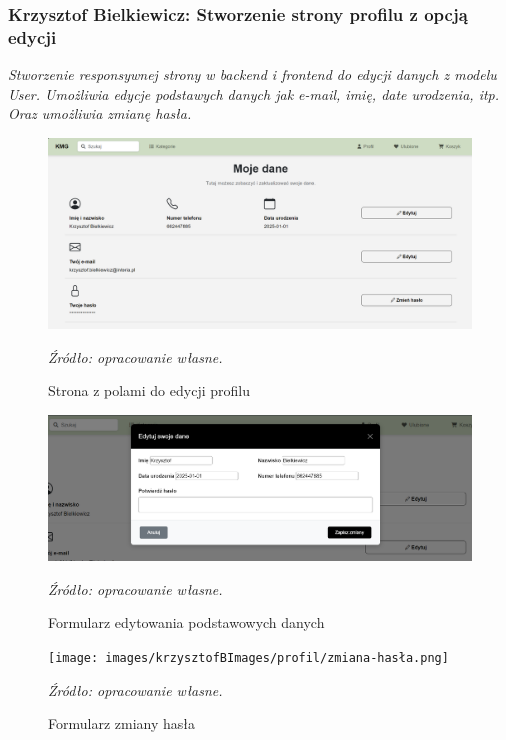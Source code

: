 \documentclass[12pt,a4paper,oneside]{article}
\theoremstyle{definition}
\numberwithin{equation}{section}
\begin{document}
\subsubsection{Krzysztof Bielkiewicz: Stworzenie strony profilu z opcją edycji}
\label{1.3.6}
\textit{Stworzenie responsywnej strony w backend i frontend do edycji danych z modelu User.
Umożliwia edycje podstawych danych jak e-mail, imię, date urodzenia, itp.
Oraz umożliwia zmianę hasła.}

\begin{figure}[H]
    \centering
    \includegraphics[width=0.9\columnwidth]{images/krzysztofBImages/profil/strona-edycji-profilu.png}
    \caption{Strona z polami do edycji profilu}
    \emph{Źródło: opracowanie własne.}
\end{figure}

\begin{figure}[H]
    \centering
    \includegraphics[width=0.9\columnwidth]{images/krzysztofBImages/profil/edycja-danych.png}
    \caption{Formularz edytowania podstawowych danych}
    \emph{Źródło: opracowanie własne.}
\end{figure}

\begin{figure}[H]
    \centering
    \texttt{[image: images/krzysztofBImages/profil/zmiana-hasła.png]}
    \caption{Formularz zmiany hasła}
    \emph{Źródło: opracowanie własne.}
\end{figure}
\end{document}
